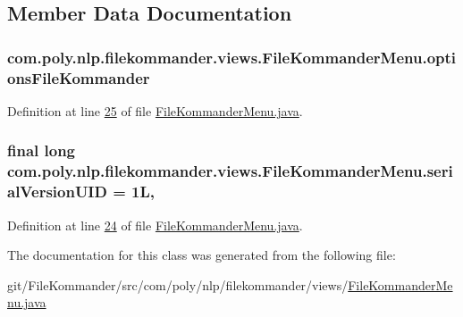\subsection{Member Data Documentation}
\hypertarget{classcom_1_1poly_1_1nlp_1_1filekommander_1_1views_1_1_file_kommander_menu_a003b2d89fc465db1befab3410121166d}{
\subsubsection[{options\-File\-Kommander}]{ com.\-poly.\-nlp.\-filekommander.\-views.\-File\-Kommander\-Menu.\-options\-File\-Kommander\hspace{0.3cm}{\ttfamily [package]}}}\label{classcom_1_1poly_1_1nlp_1_1filekommander_1_1views_1_1_file_kommander_menu_a003b2d89fc465db1befab3410121166d}


Definition at line \hyperlink{L25}{25} of file \hyperlink{}{File\-Kommander\-Menu.\-java}.

\hypertarget{classcom_1_1poly_1_1nlp_1_1filekommander_1_1views_1_1_file_kommander_menu_ae9f2507a684bcf4de4a7196385e179c7}{
\subsubsection[{serial\-Version\-U\-I\-D}]{\setlength{\rightskip}{0pt plus 5cm}final long com.\-poly.\-nlp.\-filekommander.\-views.\-File\-Kommander\-Menu.\-serial\-Version\-U\-I\-D = 1\-L\hspace{0.3cm}{\ttfamily [static]}, {\ttfamily [private]}}}\label{classcom_1_1poly_1_1nlp_1_1filekommander_1_1views_1_1_file_kommander_menu_ae9f2507a684bcf4de4a7196385e179c7}


Definition at line \hyperlink{L24}{24} of file \hyperlink{}{File\-Kommander\-Menu.\-java}.



The documentation for this class was generated from the following file\-:\begin{DoxyCompactItemize}
\item 
git/\-File\-Kommander/src/com/poly/nlp/filekommander/views/\hyperlink{_file_kommander_menu_8java}{File\-Kommander\-Menu.\-java}\end{DoxyCompactItemize}
